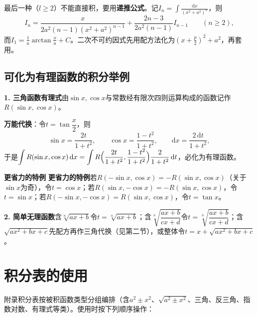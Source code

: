 \noindent 最后一种（$l\ge2$）不能直接积，要用\textbf{递推公式}。记$I_n=\displaystyle\int\frac{\mathrm{d}x}{(x^2+a^2)^n}$，则
\[
I_n=\frac{x}{2a^2(n-1)(x^2+a^2)^{n-1}}+\frac{2n-3}{2a^2(n-1)}I_{n-1}\qquad(n\ge2),
\]
而$I_1=\frac{1}{a}\arctan\frac{x}{a}+C$。二次不可约因式先用配方法化为$(x+\frac{p}{2})^2+a^2$，再套用。



\subsection{可化为有理函数的积分举例}

\noindent\textbf{1. 三角函数有理式}\quad 由$\sin x,\cos x$与常数经有限次四则运算构成的函数记作$R(\sin x,\cos x)$。

\noindent\textbf{万能代换}：令$t=\tan\dfrac{x}{2}$，则
\[
\sin x=\frac{2t}{1+t^2},\qquad \cos x=\frac{1-t^2}{1+t^2},\qquad \mathrm{d}x=\frac{2\,\mathrm{d}t}{1+t^2},
\]
于是$\displaystyle\int R(\sin x,\cos x)\,\mathrm{d}x=\int R\Bigl(\frac{2t}{1+t^2},\frac{1-t^2}{1+t^2}\Bigr)\frac{2}{1+t^2}\,\mathrm{d}t$，必化为有理函数。

\noindent\textbf{更省力的特例}
\noindent\textbf{更省力的特例}\quad 若$R(-\sin x,\cos x)=-R(\sin x,\cos x)$（关于$\sin x$为奇），令$t=\cos x$；若$R(\sin x,-\cos x)=-R(\sin x,\cos x)$，令$t=\sin x$；若$R(-\sin x,-\cos x)=R(\sin x,\cos x)$，令$t=\tan x$。

\noindent\textbf{2. 简单无理函数}\quad 含$\sqrt[n]{ax+b}$令$t=\sqrt[n]{ax+b}$；含$\sqrt[n]{\dfrac{ax+b}{cx+d}}$令$t=\sqrt[n]{\dfrac{ax+b}{cx+d}}$；含$\sqrt{ax^2+bx+c}$先配方再作三角代换（见第二节），或整体令$t=x+\sqrt{ax^2+bx+c}$。


\section{积分表的使用}

附录积分表按被积函数类型分组编排（含$a^2\pm x^2$、$\sqrt{a^2\pm x^2}$、三角、反三角、指数对数、有理式等类）。使用时按下列顺序操作：

